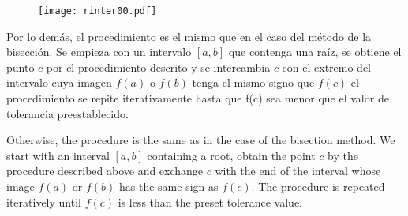 \begin{figure}[h]
\centering
\texttt{[image: rinter00.pdf]}

\label{fig:regulaf}
\end{figure}

\begin{paracol}{2}
    Por lo demás, el procedimiento es el mismo que en el caso del método de la bisección. Se empieza con un intervalo $[a,b]$ que  contenga una raíz, se obtiene el punto $c$ por el procedimiento descrito y se intercambia $c$ con el extremo del intervalo cuya imagen $f(a)$ o $f(b)$ tenga el mismo signo que $f(c)$ el procedimiento se repite iterativamente hasta que f(c) sea menor que el valor de tolerancia preestablecido. 

    \switchcolumn
    Otherwise, the procedure is the same as in the case of the bisection method. We start with an interval $[a,b]$ containing a root, obtain the point $c$ by the procedure described above and exchange $c$ with the end of the interval whose image $f(a)$ or $f(b)$ has the same sign as $f(c)$. The procedure is repeated iteratively until $f(c)$ is less than the preset tolerance value. 
    
\end{paracol}


